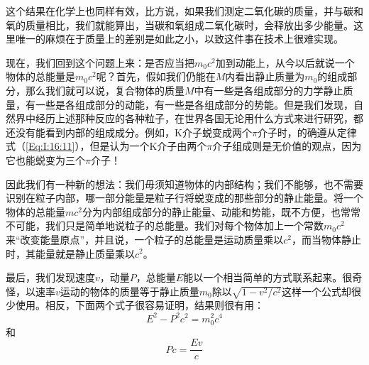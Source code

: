 这个结果在化学上也同样有效，比方说，如果我们测定二氧化碳的质量，并与碳和氧的质量相比，我们就能算出，当碳和氧组成二氧化碳时，会释放出多少能量。这里唯一的麻烦在于质量上的差别是如此之小，以致这件事在技术上很难实现。

现在，我们回到这个问题上来：是否应当把$m_0c^2$加到动能上，从今以后就说一个物体的总能量是$m_0c^2$呢？首先，假如我们仍能在$M$内看出静止质量为$m_0$的组成部分，那么我们就可以说，复合物体的质量$M$中有一些是各组成部分的力学静止质量，有一些是各组成部分的动能，有一些是各组成部分的势能。但是我们发现，自然界中经历上述那种反应的各种粒子，在世界各国无论用什么方式来进行研究，都还没有能看到内部的组成成分。例如，K介子蜕变成两个$\pi$介子时，的确遵从定律式（\ref{Eq:I:16:11}），但是认为一个K介子由两个$\pi$介子组成则是无价值的观点，因为它也能蜕变为三个$\pi$介子！

因此我们有一种新的想法：我们毋须知道物体的内部结构；我们不能够，也不需要识别在粒子内部，哪一部分能量是粒子行将蜕变成的那些部分的静止能量。将一个物体的总能量$mc^2$分为内部组成部分的静止能量、动能和势能，既不方便，也常常不可能，我们只是简单地说粒子的总能量。我们对每个物体加上一个常数$m_0c^2$来“改变能量原点”，并且说，一个粒子的总能量是运动质量乘以$c^2$，而当物体静止时，其能量就是静止质量乘以$c^2$。

最后，我们发现速度$v$，动量$P$，总能量$E$能以一个相当简单的方式联系起来。很奇怪，以速率$v$运动的物体的质量等于静止质量$m_0$除以$\sqrt{1-v^2/c^2}$这样一个公式却很少使用。相反，下面两个式子很容易证明，结果则很有用：
\begin{equation}
    \label{Eq:I:16:13}
    E^2-P^2c^2=m_0^2c^4
\end{equation}
和
\begin{equation}
    \label{Eq:I:16:14}
    Pc=\frac{Ev}{c}
\end{equation}